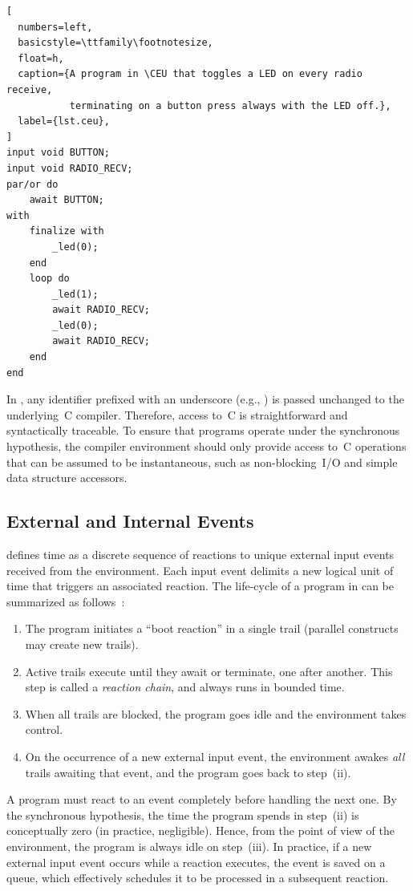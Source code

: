 \begin{lstlisting}[
  numbers=left,
  basicstyle=\ttfamily\footnotesize,
  float=h,
  caption={A program in \CEU that toggles a LED on every radio receive,
           terminating on a button press always with the LED off.},
  label={lst.ceu},
]
input void BUTTON;
input void RADIO_RECV;
par/or do
    await BUTTON;
with
    finalize with
        _led(0);
    end
    loop do
        _led(1);
        await RADIO_RECV;
        _led(0);
        await RADIO_RECV;
    end
end
\end{lstlisting}

In \CEU, any identifier prefixed with an underscore (e.g., ) is
passed unchanged to the underlying~C compiler.
%
Therefore, access to~C is straightforward and syntactically traceable.
%
To ensure that programs operate under the synchronous hypothesis, the compiler
environment should only provide access to~C operations that can be assumed to
be instantaneous, such as non-blocking~I/O and simple data structure accessors.

\subsection{External and Internal Events}
\label{sec.ceu.evts}

\CEU defines time as a discrete sequence of reactions to unique external
input events received from the environment.
%
Each input event delimits a new logical unit of time that triggers an
associated reaction.
%
The life-cycle of a program in \CEU can be summarized as
follows~\cite{ceu.sensys13}:
%
\begin{enumerate}[i]
\item The program initiates a ``boot reaction'' in a single trail (parallel
      constructs may create new trails).
\item Active trails execute until they await or terminate, one after
      another.  This step is called a \emph{reaction chain}, and always runs in
      bounded time.
\item When all trails are blocked, the program goes idle and the environment
      takes control.
\item On the occurrence of a new external input event, the environment
      awakes \emph{all} trails awaiting that event, and the program goes back to
      step~(ii).
\end{enumerate}

A program must react to an event completely before handling the next one.
%
By the synchronous hypothesis, the time the program spends in step~(ii) is
conceptually zero (in practice, negligible).
%
Hence, from the point of view of the environment, the program is always
idle on step~(iii).
%
In practice, if a new external input event occurs while a reaction executes,
the event is saved on a queue, which effectively schedules it to be processed
in a subsequent reaction.

